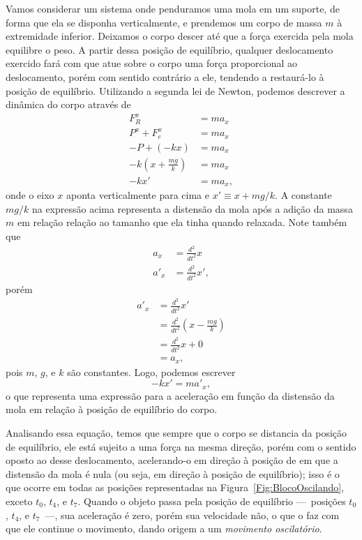Vamos considerar um sistema onde penduramos uma mola em um suporte, de forma que ela se disponha verticalmente, e prendemos um corpo de massa $m$ à extremidade inferior. Deixamos o corpo descer até que a força exercida pela mola equilibre o peso. A partir dessa posição de equilíbrio, qualquer deslocamento exercido fará com que atue sobre o corpo uma força proporcional ao deslocamento, porém com sentido contrário a ele, tendendo a restaurá-lo à posição de equilíbrio. Utilizando a segunda lei de Newton, podemos descrever a dinâmica do corpo através de
\begin{align}
    F_R^x &= m a_x \\
	P^x + F_e^x &= ma_x \\
	-P + (-kx) &= m a_x \\
	-k \left(x + \frac{mg}{k}\right) &= ma_x \\
	-kx' &= ma_x,
\end{align}
%
onde o eixo $x$ aponta verticalmente para cima e $x' \equiv x + mg/k$. A constante $mg/k$ na expressão acima representa a distensão da mola após a adição da massa $m$ em relação relação ao tamanho que ela tinha quando relaxada. Note também que
\begin{align}
    a_x &= \frac{d^2}{dt^2}x \\
    a'_x &= \frac{d^2}{dt^2}x',
\end{align}
%
porém
\begin{align}
    a'_x &= \frac{d^2}{dt^2} x' \\
    &= \frac{d^2}{dt^2} \left(x - \frac{mg}{k}\right) \\
    &= \frac{d^2}{dt^2}x + 0\\
    &= a_x,
\end{align}
%
pois $m$, $g$, e $k$ são constantes. Logo, podemos escrever
\begin{equation}
    -kx' = m a'_x,
\end{equation}
%
o que representa uma expressão para a aceleração em função da distensão da mola em relação à posição de equilíbrio do corpo.

Analisando essa equação, temos que sempre que o corpo se distancia da posição de equilíbrio, ele está sujeito a uma força na mesma direção, porém com o sentido oposto ao desse deslocamento, acelerando-o em direção à posição de em que a distensão da mola é nula (ou seja, em direção à posição de equilíbrio); isso é o que ocorre em todas as posições representadas na Figura~\ref{Fig:BlocoOscilando}, exceto $t_0$, $t_4$, e $t_7$. Quando o objeto passa pela posição de equilíbrio ---~posições $t_0$, $t_4$, e $t_7$~---, sua aceleração é zero, porém sua velocidade não, o que o faz com que ele continue o movimento, dando origem a um \emph{movimento oscilatório}.


